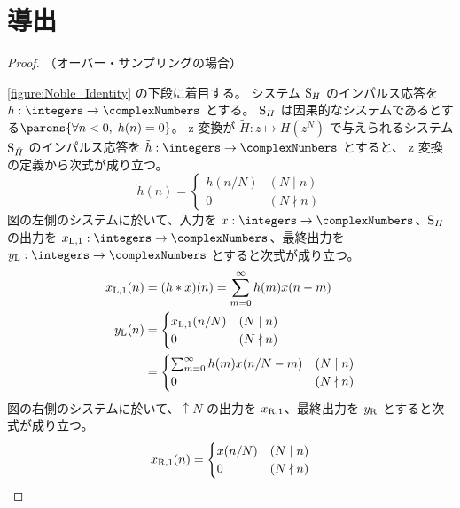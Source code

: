     \section{導出}
        \begin{proof}
            \quad\par\noindent
            （オーバー・サンプリングの場合）
            \par\noindent
            \cref{figure:Noble_Identity} の下段に着目する。
            システム $\mathrm{S}_H$ のインパルス応答を $h:\integers\to\complexNumbers$ とする。
            $\mathrm{S}_H$ は因果的なシステムであるとする$\parens{\forall n<0,\;h(n)=0}$。
            z 変換が $\tilde{H}:z\mapsto H(z^N)$ で与えられるシステム $\mathrm{S}_{\tilde{H}}$ のインパルス応答を $\tilde{h}:\integers\to\complexNumbers$ とすると、 z 変換の定義から次式が成り立つ。
            \[
                \tilde{h}(n) = \begin{cases}
                    h(n/N) & (N\mid n) \\
                    0 & (N\nmid n)
                \end{cases} \tag{1}
            \]
            図の左側のシステムに於いて、入力を $x:\integers\to\complexNumbers$、$\mathrm{S}_H$ の出力を $\xLone:\integers\to\complexNumbers$、最終出力を $\yL:\integers\to\complexNumbers$ とすると次式が成り立つ。
            \begin{align*}
                x_{\mathrm{L},1}(n) &= (h*x)(n) = \sum_{m=0}^\infty h(m)x(n-m) \\
                y_{\mathrm{L}}(n) &= \begin{cases}
                    x_{\mathrm{L},1}(n/N) & (N\mid n) \\
                    0 & (N\nmid n)
                \end{cases} \\
                &= \begin{cases}
                    \sum_{m=0}^\infty h(m)x(n/N-m) & (N\mid n) \\
                    0 & (N\nmid n)
                \end{cases}
            \end{align*}
            図の右側のシステムに於いて、$\uparrow N$ の出力を $x_{\mathrm{R},1}$、最終出力を $y_{\mathrm{R}}$ とすると次式が成り立つ。
            \begin{align*}
                \xRone(n) &= \begin{cases}
                    x(n/N) & (N\mid n) \\
                    0 & (N\nmid n)
                \end{cases} \\

\end{align*}
\end{proof}

